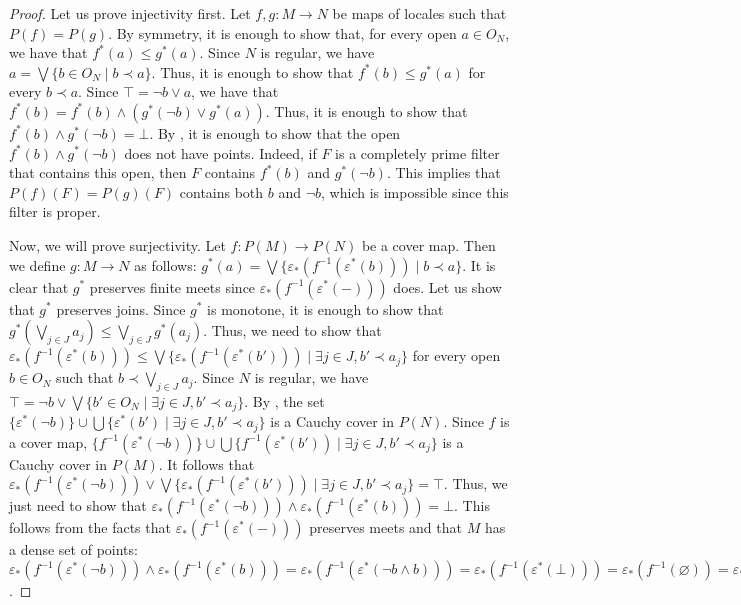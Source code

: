 \documentclass[reqno]{amsart}
\theoremstyle{definition}
\theoremstyle{remark}
\numberwithin{figure}{section}
\newcommand{\rb}{\prec}
\begin{document}
\begin{proof}
Let us prove injectivity first.
Let $f,g : M \to N$ be maps of locales such that $P(f) = P(g)$.
By symmetry, it is enough to show that, for every open $a \in O_N$, we have that $f^*(a) \leq g^*(a)$.
Since $N$ is regular, we have $a = \bigvee \{ b \in O_N \mid b \rb a \}$.
Thus, it is enough to show that $f^*(b) \leq g^*(a)$ for every $b \rb a$.
Since $\top = \neg b \vee a$, we have that $f^*(b) = f^*(b) \wedge (g^*(\neg b) \vee g^*(a))$.
Thus, it is enough to show that $f^*(b) \wedge g^*(\neg b) = \bot$.
By , it is enough to show that the open $f^*(b) \wedge g^*(\neg b)$ does not have points.
Indeed, if $F$ is a completely prime filter that contains this open, then $F$ contains $f^*(b)$ and $g^*(\neg b)$.
This implies that $P(f)(F) = P(g)(F)$ contains both $b$ and $\neg b$, which is impossible since this filter is proper.

Now, we will prove surjectivity.
Let $f : P(M) \to P(N)$ be a cover map.
Then we define $g : M \to N$ as follows: $g^*(a) = \bigvee \{ \varepsilon_*(f^{-1}(\varepsilon^*(b))) \mid b \rb a \}$.
It is clear that $g^*$ preserves finite meets since $\varepsilon_*(f^{-1}(\varepsilon^*(-)))$ does.
Let us show that $g^*$ preserves joins.
Since $g^*$ is monotone, it is enough to show that $g^*(\bigvee_{j \in J} a_j) \leq \bigvee_{j \in J} g^*(a_j)$.
Thus, we need to show that $\varepsilon_*(f^{-1}(\varepsilon^*(b))) \leq \bigvee \{ \varepsilon_*(f^{-1}(\varepsilon^*(b'))) \mid \exists j \in J, b' \rb a_j \}$ for every open $b \in O_N$ such that $b \rb \bigvee_{j \in J} a_j$.
Since $N$ is regular, we have $\top = \neg b \vee \bigvee \{ b' \in O_N \mid \exists j \in J, b' \rb a_j \}$.
By , the set $\{ \varepsilon^*(\neg b) \} \cup \bigcup \{ \varepsilon^*(b') \mid \exists j \in J, b' \rb a_j \}$ is a Cauchy cover in $P(N)$.
Since $f$ is a cover map, $\{ f^{-1}(\varepsilon^*(\neg b)) \} \cup \bigcup \{ f^{-1}(\varepsilon^*(b')) \mid \exists j \in J, b' \rb a_j \}$ is a Cauchy cover in $P(M)$.
It follows that $\varepsilon_*(f^{-1}(\varepsilon^*(\neg b))) \vee \bigvee \{ \varepsilon_*(f^{-1}(\varepsilon^*(b'))) \mid \exists j \in J, b' \rb a_j \} = \top$.
Thus, we just need to show that $\varepsilon_*(f^{-1}(\varepsilon^*(\neg b))) \wedge \varepsilon_*(f^{-1}(\varepsilon^*(b))) = \bot$.
This follows from the facts that $\varepsilon_*(f^{-1}(\varepsilon^*(-)))$ preserves meets and that $M$ has a dense set of points: $\varepsilon_*(f^{-1}(\varepsilon^*(\neg b))) \wedge \varepsilon_*(f^{-1}(\varepsilon^*(b))) = \varepsilon_*(f^{-1}(\varepsilon^*(\neg b \wedge b))) = \varepsilon_*(f^{-1}(\varepsilon^*(\bot))) = \varepsilon_*(f^{-1}(\varnothing)) = \varepsilon_*(\varnothing) = \bot$.


\end{proof}
\end{document}
